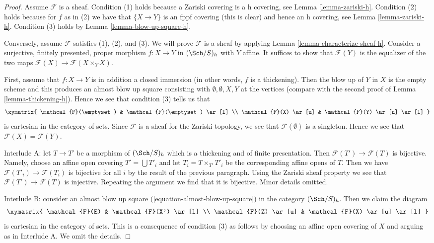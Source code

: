 \begin{proof}
Assume $\mathcal{F}$ is a sheaf. Condition (1) holds because
a Zariski covering is a h covering, see
Lemma \ref{lemma-zariski-h}.
Condition (2) holds because for $f$ as in (2) we have that
$\{X \to Y\}$ is an fppf covering (this is clear)
and hence an h covering, see Lemma \ref{lemma-zariski-h}.
Condition (3) holds by Lemma \ref{lemma-blow-up-square-h}.

\medskip\noindent
Conversely, assume $\mathcal{F}$ satisfies (1), (2), and (3).
We will prove $\mathcal{F}$ is a sheaf by applying
Lemma \ref{lemma-characterize-sheaf-h}. Consider
a surjective, finitely presented, proper morphism
$f : X \to Y$ in $(\Sch/S)_h$ with $Y$ affine. It suffices to show
that $\mathcal{F}(Y)$ is the equalizer of the two maps
$\mathcal{F}(X) \to \mathcal{F}(X \times_Y X)$.

\medskip\noindent
First, assume that $f : X \to Y$ is in addition a closed immersion
(in other words, $f$ is a thickening). Then the blow up of $Y$ in $X$
is the empty scheme and this produces an almost blow up square
consisting with $\emptyset, \emptyset, X, Y$ at the vertices
(compare with the second proof of Lemma \ref{lemma-thickening-h}).
Hence we see that condition (3) tells us that
$$
\xymatrix{
\mathcal{F}(\emptyset) & \mathcal{F}(\emptyset) \ar[l] \\
\mathcal{F}(X) \ar[u] & \mathcal{F}(Y) \ar[u] \ar[l]
}
$$
is cartesian in the category of sets. Since $\mathcal{F}$ is a sheaf
for the Zariski topology, we see that $\mathcal{F}(\emptyset)$
is a singleton. Hence we see that $\mathcal{F}(X) = \mathcal{F}(Y)$.

\medskip\noindent
Interlude A: let $T \to T'$ be a morphism of $(\Sch/S)_h$ which is
a thickening and of finite presentation. Then
$\mathcal{F}(T') \to \mathcal{F}(T)$ is bijective.
Namely, choose an affine open covering $T' = \bigcup T'_i$
and let $T_i = T \times_{T'} T'_i$ be the corresponding affine
opens of $T$. Then we have $\mathcal{F}(T'_i) \to \mathcal{F}(T_i)$
is bijective for all $i$ by the result of the previous paragraph.
Using the Zariski sheaf property we see that
$\mathcal{F}(T') \to \mathcal{F}(T)$ is injective. Repeating the
argument we find that it is bijective. Minor details omitted.

\medskip\noindent
Interlude B: consider an almost blow up square
(\ref{equation-almost-blow-up-square}) in the category $(\Sch/S)_h$.
Then we claim the diagram
$$
\xymatrix{
\mathcal{F}(E) & \mathcal{F}(X') \ar[l] \\
\mathcal{F}(Z) \ar[u] & \mathcal{F}(X) \ar[u] \ar[l]
}
$$
is cartesian in the category of sets. This is a consequence of condition
(3) as follows by choosing an affine open covering of $X$ and arguing
as in Interlude A. We omit the details.


\end{proof}
